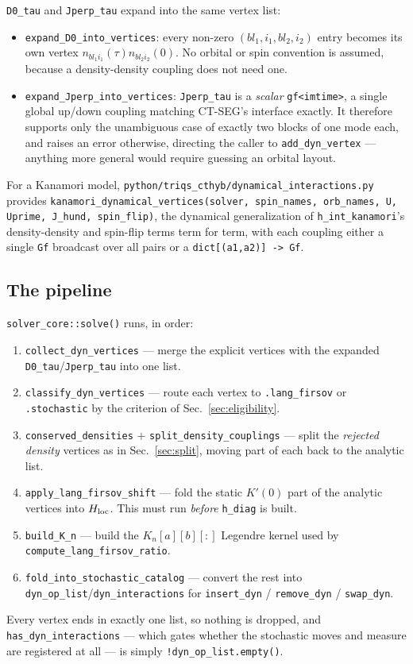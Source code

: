 \documentclass[a4paper,12pt]{article}
\renewcommand{\t}{\ensuremath{\tau}}
\newcommand{\Hloc}{\ensuremath{H_{\rm loc}}}
\begin{document}
\texttt{D0\_tau} and \texttt{Jperp\_tau} expand into the same vertex list:
\begin{itemize}
  \item \texttt{expand\_D0\_into\_vertices}: every non-zero $(bl_1,i_1,bl_2,i_2)$ entry
    becomes its own vertex $n_{bl_1 i_1}(\t)n_{bl_2 i_2}(0)$. No orbital or spin
    convention is assumed, because a density-density coupling does not need one.
  \item \texttt{expand\_Jperp\_into\_vertices}: \texttt{Jperp\_tau} is a \emph{scalar}
    \texttt{gf<imtime>}, a single global up/down coupling matching CT-SEG's interface
    exactly. It therefore supports only the unambiguous case of exactly two blocks of
    one mode each, and raises an error otherwise, directing the caller to
    \texttt{add\_dyn\_vertex} --- anything more general would require guessing an orbital
    layout.
\end{itemize}
For a Kanamori model, \texttt{python/triqs\_cthyb/dynamical\_interactions.py} provides
\texttt{kanamori\_dynamical\_vertices(solver, spin\_names, orb\_names, U, Uprime, J\_hund,
spin\_flip)}, the dynamical generalization of \texttt{h\_int\_kanamori}'s density-density
and spin-flip terms term for term, with each coupling either a single \texttt{Gf}
broadcast over all pairs or a \texttt{dict[(a1,a2)] -> Gf}.

\subsection{The pipeline}

\texttt{solver\_core::solve()} runs, in order:
\begin{enumerate}
  \item \texttt{collect\_dyn\_vertices} --- merge the explicit vertices with the expanded
    \texttt{D0\_tau}/\texttt{Jperp\_tau} into one list.
  \item \texttt{classify\_dyn\_vertices} --- route each vertex to \texttt{.lang\_firsov}
    or \texttt{.stochastic} by the criterion of Sec.~\ref{sec:eligibility}.
  \item \texttt{conserved\_densities} $+$ \texttt{split\_density\_couplings} --- split the
    \emph{rejected density} vertices as in Sec.~\ref{sec:split}, moving part of each back
    to the analytic list.
  \item \texttt{apply\_lang\_firsov\_shift} --- fold the static $K'(0)$ part of the
    analytic vertices into $\Hloc$. This must run \emph{before} \texttt{h\_diag} is built.
  \item \texttt{build\_K\_n} --- build the $K_n[a][b][:]$ Legendre kernel used by
    \texttt{compute\_lang\_firsov\_ratio}.
  \item \texttt{fold\_into\_stochastic\_catalog} --- convert the rest into
    \texttt{dyn\_op\_list}/\texttt{dyn\_interactions} for \texttt{insert\_dyn} /
    \texttt{remove\_dyn} / \texttt{swap\_dyn}.
\end{enumerate}
Every vertex ends in exactly one list, so nothing is dropped, and
\texttt{has\_dyn\_interactions} --- which gates whether the stochastic moves and measure
are registered at all --- is simply \verb|!dyn_op_list.empty()|.
\end{document}
